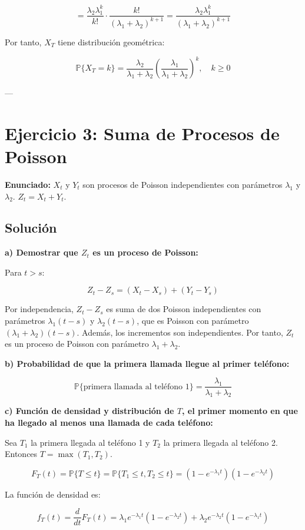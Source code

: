 \documentclass{article}
\theoremstyle{definition}
\newcommand{\Prob}{\mathbb{P}}
\begin{document}
\[
= \frac{\lambda_2 \lambda_1^k}{k!} \cdot \frac{k!}{(\lambda_1+\lambda_2)^{k+1}} = \frac{\lambda_2 \lambda_1^k}{(\lambda_1+\lambda_2)^{k+1}}
\]

Por tanto, $X_T$ tiene distribución geométrica:

\[
\Prob\{X_T = k\} = \frac{\lambda_2}{\lambda_1+\lambda_2} \left(\frac{\lambda_1}{\lambda_1+\lambda_2}\right)^k, \quad k \geq 0
\]

---

\section*{Ejercicio 3: Suma de Procesos de Poisson}

\textbf{Enunciado:} $X_t$ y $Y_t$ son procesos de Poisson independientes con parámetros $\lambda_1$ y $\lambda_2$. $Z_t = X_t + Y_t$.

\subsection*{Solución}

\textbf{a) Demostrar que $Z_t$ es un proceso de Poisson:}

Para $t > s$:

\[
Z_t - Z_s = (X_t - X_s) + (Y_t - Y_s)
\]

Por independencia, $Z_t - Z_s$ es suma de dos Poisson independientes con parámetros $\lambda_1(t-s)$ y $\lambda_2(t-s)$, que es Poisson con parámetro $(\lambda_1+\lambda_2)(t-s)$. Además, los incrementos son independientes. Por tanto, $Z_t$ es un proceso de Poisson con parámetro $\lambda_1+\lambda_2$.

\textbf{b) Probabilidad de que la primera llamada llegue al primer teléfono:}

\[
\Prob\{\text{primera llamada al teléfono 1}\} = \frac{\lambda_1}{\lambda_1+\lambda_2}
\]

\textbf{c) Función de densidad y distribución de $T$, el primer momento en que ha llegado al menos una llamada de cada teléfono:}

Sea $T_1$ la primera llegada al teléfono 1 y $T_2$ la primera llegada al teléfono 2. Entonces $T = \max(T_1, T_2)$.

\[
F_T(t) = \Prob\{T \leq t\} = \Prob\{T_1 \leq t, T_2 \leq t\} = (1 - e^{-\lambda_1 t})(1 - e^{-\lambda_2 t})
\]

La función de densidad es:

\[
f_T(t) = \frac{d}{dt}F_T(t) = \lambda_1 e^{-\lambda_1 t}(1 - e^{-\lambda_2 t}) + \lambda_2 e^{-\lambda_2 t}(1 - e^{-\lambda_1 t})
\]
\end{document}
